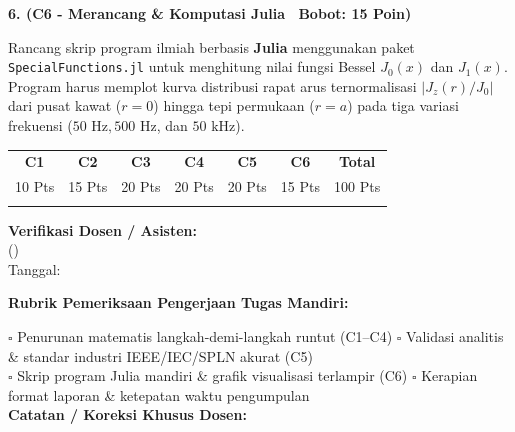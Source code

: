 \documentclass[10pt,a4paper]{article}
\begin{document}
\vspace{3.5mm}

\noindent\textbf{6. (C6 - Merancang \& Komputasi Julia \textbar\ Bobot: 15 Poin)}\par\vspace{0.8mm}
{\footnotesize Rancang skrip program ilmiah berbasis \textbf{Julia} menggunakan paket \texttt{SpecialFunctions.jl} untuk menghitung nilai fungsi Bessel $J_0(x)$ dan $J_1(x)$. Program harus memplot kurva distribusi rapat arus ternormalisasi $|J_z(r)/J_0|$ dari pusat kawat ($r = 0$) hingga tepi permukaan ($r = a$) pada tiga variasi frekuensi ($50\text{ Hz}, 500\text{ Hz}$, dan $50\text{ kHz}$).}\par

\vfill

\noindent\begin{minipage}[b]{0.62\textwidth}%
  \centering
  \scriptsize
  \begin{tabular}{|c|c|c|c|c|c|c|}
    \hline
    \rowcolor{unibblue}
    \textbf{\color{white}C1} & \textbf{\color{white}C2} & \textbf{\color{white}C3} & \textbf{\color{white}C4} & \textbf{\color{white}C5} & \textbf{\color{white}C6} & \textbf{\color{white}Total} \\
    \rowcolor{unibblue!10}
    10 Pts & 15 Pts & 20 Pts & 20 Pts & 20 Pts & 15 Pts & 100 Pts \\
    \hline
    & & & & & & \\[3mm]
    \hline
  \end{tabular}%
\end{minipage}%
\hfill%
\begin{minipage}[b]{0.35\textwidth}%
  \centering
  \scriptsize
  \textbf{Verifikasi Dosen / Asisten:}\\[6mm]
  (\dotfill)\\[1mm]
  \tiny Tanggal: \dotfill
\end{minipage}\par

\vspace{2mm}
\begin{tcolorbox}[colback=white,colframe=unibblue!40!black,colbacktitle=unibblue!10,coltitle=unibblue,boxrule=0.5pt,arc=2pt,left=5pt,right=5pt,top=3pt,bottom=3pt,title=\textbf{\tiny Catatan Evaluasi \& Umpan Balik Dosen Pengampu}]
  \tiny
  \textbf{Rubrik Pemeriksaan Pengerjaan Tugas Mandiri:}\par\vspace{0.8mm}
  $\square$ Penurunan matematis langkah-demi-langkah runtut (C1--C4) \hfill $\square$ Validasi analitis \& standar industri IEEE/IEC/SPLN akurat (C5)\\[0.8mm]
  $\square$ Skrip program Julia mandiri \& grafik visualisasi terlampir (C6) \hfill $\square$ Kerapian format laporan \& ketepatan waktu pengumpulan\\[2.0mm]
  \textbf{Catatan / Koreksi Khusus Dosen:}\\[1.6cm]
\end{tcolorbox}
\end{document}
